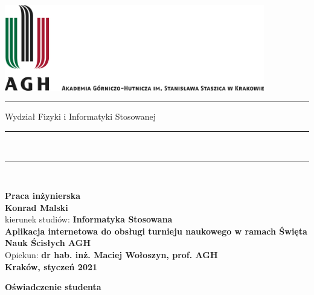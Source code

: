 \documentclass[a4paper,12pt]{article}
\begin{document}

\thispagestyle{empty}

\includegraphics[height=37.5mm]{agh_logo}\\
\rule{30mm}{0pt}
{\large\textsf{Wydział Fizyki i Informatyki Stosowanej}}\\
\rule{\textwidth}{3pt}\\
\rule[2ex]
{\textwidth}{1pt}\\
\vspace{7ex}
\begin{center}
{\bf\LARGE\textsf{Praca inżynierska}}\\
\vspace{13ex}
{\bf\Large\textsf{Konrad Malski}}\\
\vspace{3ex}
{\sf \small kierunek studiów:} {\bf\small\textsf{Informatyka Stosowana}}\\
\vspace{15ex}
{\bf\huge\textsf{Aplikacja internetowa do obsługi turnieju naukowego w ramach Święta Nauk Ścisłych AGH}}\\
\vspace{14ex}
{\sf \Large Opiekun:} {\bf\Large\textsf{dr hab. inż. Maciej Wołoszyn, prof. AGH}}\\
\vspace{22ex}
\textsf{\bf\large\textsf{Kraków, styczeń 2021}}
\end{center}

\newpage

\begin{center}
	{\bf\large\textsf{Oświadczenie studenta}}
\end{center}
\end{document}
